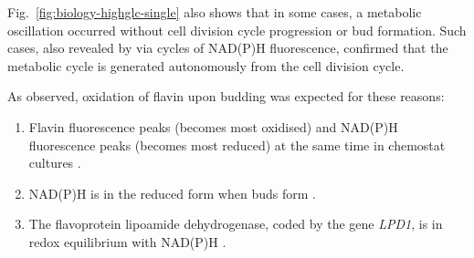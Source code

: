 Fig.\ \ref{fig:biology-highglc-single} also shows that in some cases, a metabolic oscillation occurred without cell division cycle progression or bud formation.
Such cases, also revealed by \textcite{papagiannakisAutonomousMetabolicOscillations2017} via cycles of NAD(P)H fluorescence, confirmed that the metabolic cycle is generated autonomously from the cell division cycle.

As observed, oxidation of flavin upon budding was expected for these reasons:
\begin{enumerate}
  \item Flavin fluorescence peaks (becomes most oxidised) and NAD(P)H fluorescence peaks (becomes most reduced) at the same time in chemostat cultures \parencite{murrayRedoxRegulationRespiring2011}.
  \item NAD(P)H is in the reduced form when buds form \parencite{papagiannakisAutonomousMetabolicOscillations2017}.
  \item The flavoprotein lipoamide dehydrogenase, coded by the gene \textit{LPD1}, is in redox equilibrium with NAD(P)H \parencite{sianoNADHFlavinFluorescence1989}.
\end{enumerate}

